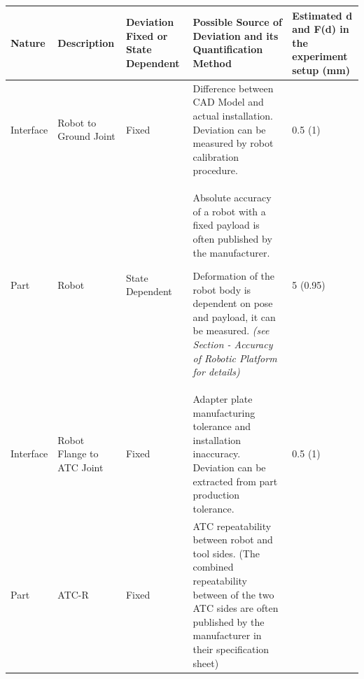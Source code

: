 \documentclass[11pt]{book}
\begin{document}
\begin{table}[H]
\begin{adjustbox}{max width=\textwidth}
\begin{tabular}{p{1.72cm}p{3.94cm}p{1.98cm}p{6.27cm}p{2.01cm}}
\hline
\multicolumn{1}{|p{1.72cm}}{{\scriptsize \textbf{Nature}}} & 
\multicolumn{1}{|p{3.94cm}}{{\scriptsize \textbf{Description }}} & 
\multicolumn{1}{|p{1.98cm}}{{\scriptsize \textbf{Deviation Fixed or State Dependent}}} & 
\multicolumn{1}{|p{6.27cm}}{{\scriptsize \textbf{Possible Source of Deviation and its Quantification Method}}} & 
\multicolumn{1}{|p{2.01cm}|}{{\scriptsize \textbf{Estimated d and F(d) in the experiment setup (mm)}}} \\ 
\hline
\multicolumn{1}{|p{1.72cm}}{{\scriptsize Interface}} & 
\multicolumn{1}{|p{3.94cm}}{{\scriptsize Robot to Ground Joint}} & 
\multicolumn{1}{|p{1.98cm}}{{\scriptsize Fixed}} & 
\multicolumn{1}{|p{6.27cm}}{{\scriptsize Difference between CAD Model and actual installation. Deviation can be measured by robot calibration procedure.\par}} & 
\multicolumn{1}{|p{2.01cm}|}{{\scriptsize 0.5 (1)}} \\ 
\hline
\multicolumn{1}{|p{1.72cm}}{{\scriptsize Part}} & 
\multicolumn{1}{|p{3.94cm}}{{\scriptsize Robot}} & 
\multicolumn{1}{|p{1.98cm}}{{\scriptsize State Dependent}} & 
\multicolumn{1}{|p{6.27cm}}{{\scriptsize Absolute accuracy of a robot with a fixed payload is often published by the manufacturer. } \newline
{\scriptsize Deformation of the robot body is dependent on pose and payload, it can be measured. \textit{(see Section - Accuracy of Robotic Platform for details)}\par}} & 
\multicolumn{1}{|p{2.01cm}|}{{\scriptsize 5 (0.95)}} \\ 
\hline
\multicolumn{1}{|p{1.72cm}}{{\scriptsize Interface}} & 
\multicolumn{1}{|p{3.94cm}}{{\scriptsize Robot Flange to ATC Joint}} & 
\multicolumn{1}{|p{1.98cm}}{{\scriptsize Fixed}} & 
\multicolumn{1}{|p{6.27cm}}{{\scriptsize Adapter plate manufacturing tolerance and installation inaccuracy. Deviation can be extracted from part production tolerance.\par}} & 
\multicolumn{1}{|p{2.01cm}|}{{\scriptsize 0.5 (1)}} \\ 
\hline
\multicolumn{1}{|p{1.72cm}}{{\scriptsize Part}} & 
\multicolumn{1}{|p{3.94cm}}{{\scriptsize ATC-R}} & 
\multicolumn{1}{|p{1.98cm}}{{\scriptsize Fixed}} & 
\multicolumn{1}{|p{6.27cm}}{\multirow{3}{*}{\parbox{6.27cm}{{\scriptsize ATC repeatability between robot and tool sides. (The combined repeatability between of the two ATC sides are often published by the manufacturer in their specification sheet)\par}}}} & 

\end{tabular}
\end{adjustbox}
\end{table}
\end{document}
